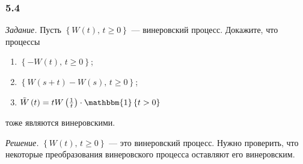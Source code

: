 \subsubsection*{5.4}

\textit{Задание.}
Пусть $ \left\{ W \left( t \right), \, t \geq 0 \right\} $ --- винеровский процесс.
Докажите, что процессы
\begin{enumerate}[label=\alph*)]
  \item $ \left\{ -W \left( t \right), \, t \geq 0 \right\} $;
  \item $ \left\{ W \left( s + t \right) - W \left( s \right), \, t \geq 0 \right\} $;
  \item $ \tilde{W} \left( t \right) =
    tW \left( \frac{1}{t} \right) \cdot \mathbbm{1} \left\{ t > 0 \right\} $
\end{enumerate}
тоже являются винеровскими.

\textit{Решение.}
$ \left\{ W \left( t \right), \, t \geq 0 \right\} $ --- это винеровский процесс.
Нужно проверить, что некоторые преобразования винеровского процесса оставляют его винеровским.

